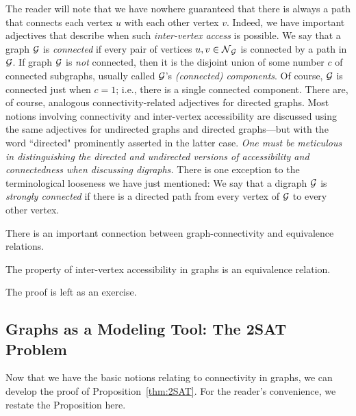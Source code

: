 The reader will note that we have nowhere guaranteed that there is always a
path that connects each vertex $u$ with each other vertex $v$.  Indeed, we have
important adjectives that describe when such {\em inter-vertex access} is possible.
We say that a graph $\mbox{$\cal G$}$ is {\it connected} if every pair of vertices $u, v \in \mbox{$\cal N$}_{\mbox{{\scriptsize $\cal G$}}}$
is connected by a path in $\mbox{$\cal G$}$.  If graph $\mbox{$\cal G$}$ is {\em not} connected, then it is the
disjoint union of some number $c$ of connected subgraphs, usually called $\mbox{$\cal G$}$'s
{\it (connected) components}.  Of course, $\mbox{$\cal G$}$ is connected just when $c=1$; i.e., 
there is a single connected component.  There are, of course, analogous connectivity-related
adjectives for directed graphs.  Most notions involving connectivity and inter-vertex
accessibility are discussed using the same adjectives for undirected graphs and directed
graphs---but with the word ``directed" prominently asserted in the latter case.
{\em One must be meticulous in distinguishing the directed and undirected versions of
accessibility and connectedness when discussing digraphs.}  There is one exception to
the terminological looseness we have just mentioned: We say that a digraph $\mbox{$\cal G$}$ is
{\it strongly connected} if there is a directed path from every vertex of $\mbox{$\cal G$}$ to every
other vertex.

There is an important connection between graph-connectivity and equivalence relations.

\begin{prop}
\label{thm:Accessibility-Equivalence}
The property of inter-vertex accessibility in graphs is an equivalence relation.
\end{prop}

The proof is left as an exercise.


\subsection{Graphs as a Modeling Tool: The {\sf 2SAT} Problem}
\label{sec:graph-model-2SAT}

Now that we have the basic notions relating to connectivity in graphs, we can develop the proof of Proposition~\ref{thm:2SAT}.  For the reader's convenience, we restate the Proposition here.

